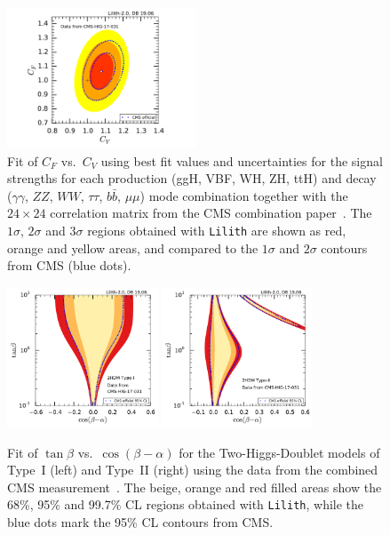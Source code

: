 \begin{figure}[t!]\centering
\includegraphics[width=0.5\textwidth]{validation/CMS/HIG-17-031-CVCF.pdf}
\caption{Fit of $C_F$ vs.\ $C_V$ using best fit values and uncertainties for the signal strengths for each production (ggH, VBF, WH, ZH, ttH) 
and decay ($\gamma\gamma$, $ZZ$, $WW$, $\tau\tau$, $b\bar b$, $\mu\mu$) mode combination together with the 
$24\times 24$ correlation matrix from the CMS combination paper~\cite{Sirunyan:2018koj}. 
The  $1\sigma$,  $2\sigma$ and $3\sigma$ regions obtained with {\tt Lilith} are shown as red, orange and yellow areas, 
and compared to the $1\sigma$ and $2\sigma$ contours from CMS (blue dots).}
\label{fig:validation_cms_combination}
\end{figure}

\begin{figure}[t!]\centering
\includegraphics[width=0.4\textwidth]{validation/CMS/HIG-17-031-2HDM-Type1.pdf}%
\includegraphics[width=0.4\textwidth]{validation/CMS/HIG-17-031-2HDM-Type2.pdf}
\caption{Fit of $\tan\beta$ vs.\ $\cos(\beta-\alpha)$ for the Two-Higgs-Doublet models of Type~I (left) and Type~II (right) 
using the data from the combined CMS measurement~\cite{Sirunyan:2018koj}. 
The beige, orange and red filled areas show the 68\%, 95\% and 99.7\% CL regions obtained with {\tt Lilith}, 
while the blue dots mark the 95\% CL contours from CMS.}
\label{fig:validation_cms_2hdm}
\end{figure}

